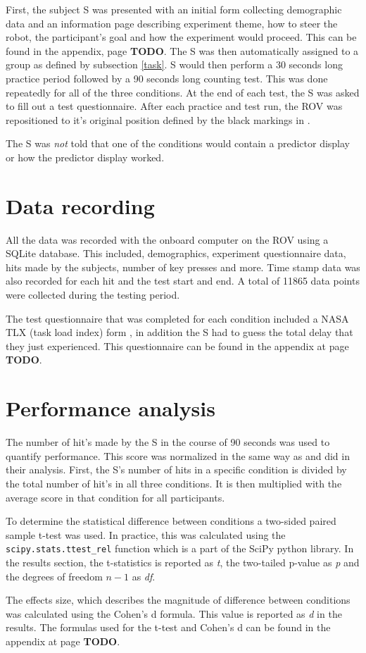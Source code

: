 First, the subject S was presented with an initial form collecting demographic data and an information page describing experiment theme, how to steer the robot, the participant's goal and how the experiment would proceed. This can be found in the appendix, page \textbf{TODO}. The S was then automatically assigned to a group as defined by subsection \ref{task}. S would then perform a 30 seconds long practice period followed by a 90 seconds long counting test. This was done repeatedly for all of the three conditions. At the end of each test, the S was asked to fill out a test questionnaire.  After each practice and test run, the ROV was repositioned to it's original position defined by the black markings in .

The S was \emph{not} told that one of the conditions would contain a predictor display or how the predictor display worked.


\section{Data recording}

All the data was recorded with the onboard computer on the ROV using a SQLite database. This included, demographics, experiment questionnaire data, hits made by the subjects, number of key presses and more. Time stamp data was also recorded for each hit and the test start and end. A total of 11865 data points were collected during the testing period.

The test questionnaire that was completed for each condition included a NASA TLX (task load index) form \citep{Hart1988}, in addition the S had to guess the total delay that they just experienced. This questionnaire can be found in the appendix at page \textbf{TODO}.

\section{Performance analysis}


The number of hit's made by the S in the course of 90 seconds was used to quantify performance. This score was normalized in the same way as \citep{Rachmielowski2010} and \citep{Lovi2014} did in their analysis. First, the S's number of hits in a specific condition is divided by the total number of hit's in all three conditions. It is then multiplied with the average score in that condition for all participants.

To determine the statistical difference between conditions a two-sided paired sample t-test was used. In practice, this was calculated using the \texttt{scipy.stats.ttest\_rel} function which is a part of the SciPy python library. In the results section, the t-statistics is reported as \emph{t}, the two-tailed p-value as \emph{p} and the degrees of freedom $n-1$ as \emph{df}.

The effects size, which describes the magnitude of difference between conditions was calculated using the Cohen's d formula. This value is reported as \emph{d} in the results. The formulas used for the t-test and Cohen's d can be found in the appendix at page \textbf{TODO}.